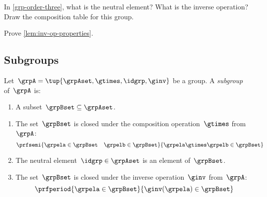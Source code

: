 \vfill%

\begin{gradedexercise}
    \label{ex:GroupWithThreeElements}
    In \cref{grp-order-three}, what is the neutral element?
    What is the inverse operation?
    Draw the composition table for this group.
\end{gradedexercise}

\begin{gradedexercise}
    \label{ex:GroupInverseProperties}
    Prove \cref{lem:inv-op-properties}.
\end{gradedexercise}



\subsection{Subgroups}



\begin{definition}
Let~$\grpA = \tup{\grpAset, \gtimes, \idgrp, \ginv}$ be a group. 
A \emph{subgroup} of~$\grpA$ is:

\constit

\begin{enumerate}
\item A subset~$\grpBset \subseteq \grpAset$.
\end{enumerate}

\condit

\begin{enumerate}
\item The set~$\grpBset$ is closed under the composition operation~$\gtimes$ from~$\grpA$:
\begin{equation}
\prfsemi{\grpela \in \grpBset \quad \grpelb \in \grpBset}{\grpela \gtimes \grpelb \in \grpBset}
\end{equation}

\item The neutral element~$\idgrp \in \grpAset$ is an element of~$\grpBset$.

\item The set~$\grpBset$ is closed under the inverse operation~$\ginv$ from~$\grpA$:
\begin{equation}
\prfperiod{\grpela \in \grpBset}{\ginv(\grpela) \in \grpBset}
\end{equation}
\end{enumerate}
\end{definition}
